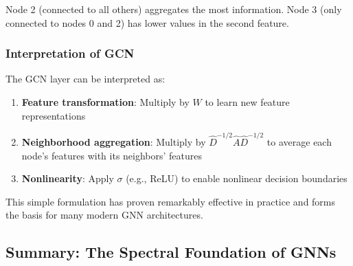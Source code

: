 \begin{notechapter}
\begin{example}
Node 2 (connected to all others) aggregates the most information. 
Node 3 (only connected to nodes 0 and 2) has lower values in the 
second feature.
\end{example}

\subsubsection{Interpretation of GCN}

The GCN layer can be interpreted as:
\begin{enumerate}
\item \textbf{Feature transformation}: Multiply by $W$ to learn 
      new feature representations
\item \textbf{Neighborhood aggregation}: Multiply by 
      $\hat{D}^{-1/2} \hat{A} \hat{D}^{-1/2}$ to average each node's 
      features with its neighbors' features
\item \textbf{Nonlinearity}: Apply $\sigma$ (e.g., ReLU) to enable 
      nonlinear decision boundaries
\end{enumerate}

This simple formulation has proven remarkably effective in practice and 
forms the basis for many modern GNN architectures.

\subsection{Summary: The Spectral Foundation of GNNs}

\begin{center}
\end{center}
\end{notechapter}

